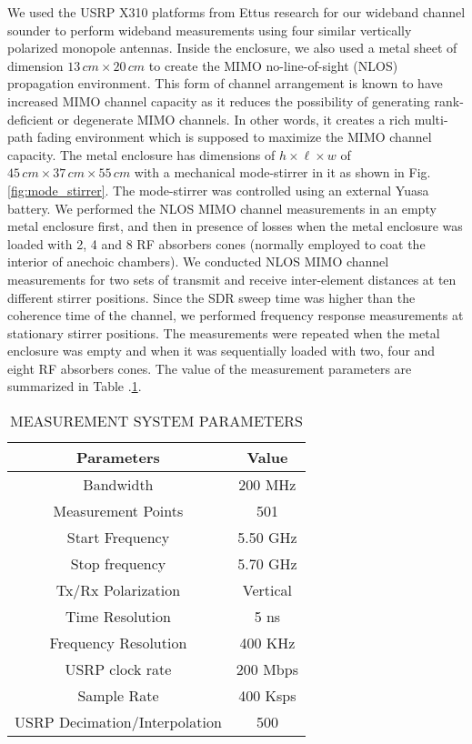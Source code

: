 \documentclass[10pt, final, journal, letterpaper, oneside, twocolumn]{IEEEtran}
\begin{document}
We used the USRP X310 platforms from Ettus research for our wideband channel sounder to perform wideband measurements using four similar vertically polarized monopole antennas. 
Inside the enclosure, we also used a metal sheet of dimension $13\,cm \times 20\,cm$ to create the MIMO no-line-of-sight (NLOS) propagation environment. This form of channel arrangement is known to have increased MIMO channel capacity as it reduces the possibility of generating rank-deficient or degenerate MIMO channels. 
In other words, it creates a rich multi-path fading environment which is supposed to maximize the MIMO channel capacity. The metal enclosure has dimensions of $h\times \ell \times w$ of $45\,cm\times 37\,cm\times 55\,cm$ with a mechanical mode-stirrer in it as shown in Fig. \ref{fig:mode_stirrer}. The mode-stirrer was controlled using an external Yuasa battery. We performed the NLOS MIMO channel measurements in an empty metal enclosure first, and then in presence of losses when the metal enclosure was loaded with 2, 4 and 8 RF absorbers cones (normally employed to coat the interior of anechoic chambers). We conducted NLOS MIMO channel measurements for two sets of transmit and receive inter-element distances at ten different stirrer positions. Since the SDR sweep time was higher than the coherence time of the channel, we performed frequency response measurements at stationary stirrer positions. The measurements were repeated when the metal enclosure was empty and when it was sequentially loaded with two, four and eight RF absorbers cones. 
The value of the measurement parameters are summarized in Table .\ref{tab:measurement_setup}.
\begin{table}[h]
    \centering
     \caption{MEASUREMENT SYSTEM PARAMETERS}
    \begin{tabular}{|c|c|}
        \hline
        Parameters & Value  \\
        \hline
         Bandwidth & 200 MHz\\
         Measurement Points& 501\\
         Start Frequency & 5.50 GHz\\
         Stop frequency & 5.70 GHz\\
         Tx/Rx Polarization & Vertical\\
         Time Resolution & 5 ns\\
         Frequency Resolution & 400 KHz\\
         USRP clock rate & 200 Mbps\\
         Sample Rate & 400 Ksps\\
         USRP Decimation/Interpolation&500\\
         \hline
    \end{tabular}
   
    \label{tab:measurement_setup}
\end{table}
\vspace{-0.35cm}
\end{document}
